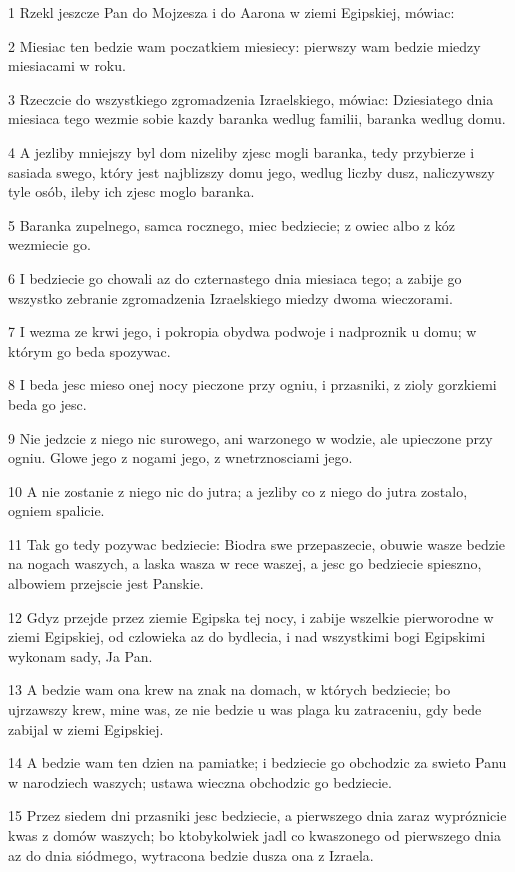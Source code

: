 \par 1 Rzekl jeszcze Pan do Mojzesza i do Aarona w ziemi Egipskiej, mówiac:
\par 2 Miesiac ten bedzie wam poczatkiem miesiecy: pierwszy wam bedzie miedzy miesiacami w roku.
\par 3 Rzeczcie do wszystkiego zgromadzenia Izraelskiego, mówiac: Dziesiatego dnia miesiaca tego wezmie sobie kazdy baranka wedlug familii, baranka wedlug domu.
\par 4 A jezliby mniejszy byl dom nizeliby zjesc mogli baranka, tedy przybierze i sasiada swego, który jest najblizszy domu jego, wedlug liczby dusz, naliczywszy tyle osób, ileby ich zjesc moglo baranka.
\par 5 Baranka zupelnego, samca rocznego, miec bedziecie; z owiec albo z kóz wezmiecie go.
\par 6 I bedziecie go chowali az do czternastego dnia miesiaca tego; a zabije go wszystko zebranie zgromadzenia Izraelskiego miedzy dwoma wieczorami.
\par 7 I wezma ze krwi jego, i pokropia obydwa podwoje i nadproznik u domu; w którym go beda spozywac.
\par 8 I beda jesc mieso onej nocy pieczone przy ogniu, i przasniki, z zioly gorzkiemi beda go jesc.
\par 9 Nie jedzcie z niego nic surowego, ani warzonego w wodzie, ale upieczone przy ogniu. Glowe jego z nogami jego, z wnetrznosciami jego.
\par 10 A nie zostanie z niego nic do jutra; a jezliby co z niego do jutra zostalo, ogniem spalicie.
\par 11 Tak go tedy pozywac bedziecie: Biodra swe przepaszecie, obuwie wasze bedzie na nogach waszych, a laska wasza w rece waszej, a jesc go bedziecie spieszno, albowiem przejscie jest Panskie.
\par 12 Gdyz przejde przez ziemie Egipska tej nocy, i zabije wszelkie pierworodne w ziemi Egipskiej, od czlowieka az do bydlecia, i nad wszystkimi bogi Egipskimi wykonam sady, Ja Pan.
\par 13 A bedzie wam ona krew na znak na domach, w których bedziecie; bo ujrzawszy krew, mine was, ze nie bedzie u was plaga ku zatraceniu, gdy bede zabijal w ziemi Egipskiej.
\par 14 A bedzie wam ten dzien na pamiatke; i bedziecie go obchodzic za swieto Panu w narodziech waszych; ustawa wieczna obchodzic go bedziecie.
\par 15 Przez siedem dni przasniki jesc bedziecie, a pierwszego dnia zaraz wypróznicie kwas z domów waszych; bo ktobykolwiek jadl co kwaszonego od pierwszego dnia az do dnia siódmego, wytracona bedzie dusza ona z Izraela.

